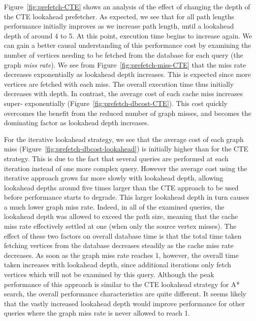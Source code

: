 Figure~\ref{fig:prefetch-CTE} shows an analysis of the effect of changing the
depth of the CTE lookahead prefetcher. As expected, we see that for all path
lengths performance initially improves as we increase path length, until a
lookahead depth of around 4 to 5. At this point, execution time begins to
increase again. We can gain a better causal understanding of this performance
cost by examining  the number of vertices needing to be fetched from the
database for each query (the graph \textit{miss rate}). We see from
Figure~\ref{fig:prefetch-miss-CTE} that the miss rate decreases exponentially
as lookahead depth increases. This is expected since more vertices are fetched
with each miss. The overall execution time thus initially decreases with
depth. In contrast, the average cost of each cache miss increases super-
exponentially (Figure~\ref{fig:prefetch-dbcost-CTE}). This cost quickly
overcomes the benefit from the reduced number of graph misses, and becomes the
dominating factor as lookahead depth increases.

For the iterative lookahead strategy, we see that the average cost of each
graph miss (Figure~\ref{fig:prefetch-dbcost-lookahead}) is initially higher
than for the CTE strategy. This is due to the fact that several queries are
performed at each iteration instead of one more complex query. However the
average cost using the iterative approach grows far more slowly with lookahead
depth, allowing lookahead depths around five times larger than the CTE
approach to be used before performance starts to degrade. This larger
lookahead depth in turn causes a much lower graph miss rate. Indeed, in all of
the examined queries, the lookahead depth was allowed to exceed the path size,
meaning that the cache miss rate effectively settled at one (when only the
source vertex misses). The effect of these two factors on overall database
time is that the total time taken fetching vertices from the database
decreases steadily as the cache miss rate decreases. As soon as the graph miss
rate reaches 1, however, the overall time taken increases with lookahead
depth, since additional iterations only fetch vertices which will not be
examined by this query. Although the peak performance of this approach is
similar to the CTE lookahead strategy for A* search, the overall performance
characteristics are quite different. It seems likely that the vastly increased
lookahead depth would improve performance for other queries where the graph miss
rate is never allowed to reach 1.

